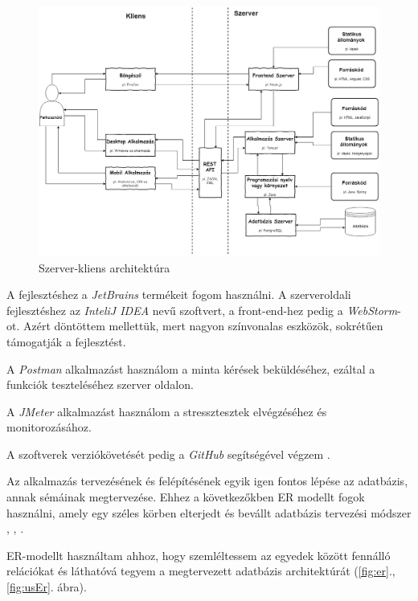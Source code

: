 \begin{figure}[h!]
\centering
\includegraphics[scale=0.365]{kepek/architecture.jpg}
\caption{Szerver-kliens architektúra}
\label{fig:architecture}
\end{figure}


A fejlesztéshez a \textit{JetBrains} termékeit fogom használni. A szerveroldali fejlesztéshez az \textit{InteliJ IDEA} nevű szoftvert, a front-end-hez pedig a \textit{WebStorm}-ot. Azért döntöttem mellettük, mert nagyon színvonalas eszközök, sokrétűen támogatják a fejlesztést.
 
A \textit{Postman} alkalmazást használom a minta kérések beküldéséhez, ezáltal a funkciók teszteléséhez szerver oldalon.

A \textit{JMeter} alkalmazást használom a stressztesztek elvégzéséhez és monitorozásához.

A szoftverek verziókövetését pedig a \textit{GitHub} segítségével végzem \cite{5}.


Az alkalmazás tervezésének és felépítésének egyik igen fontos lépése az adatbázis, annak sémáinak megtervezése. Ehhez a következőkben ER modellt fogok használni, amely egy széles körben elterjedt és bevállt adatbázis tervezési módszer \cite{11}, \cite{12}, \cite{13}.


ER-modellt használtam ahhoz, hogy szemléltessem az egyedek között fennálló relációkat és láthatóvá tegyem a megtervezett adatbázis architektúrát (\ref{fig:er}., \ref{fig:usEr}. ábra).

